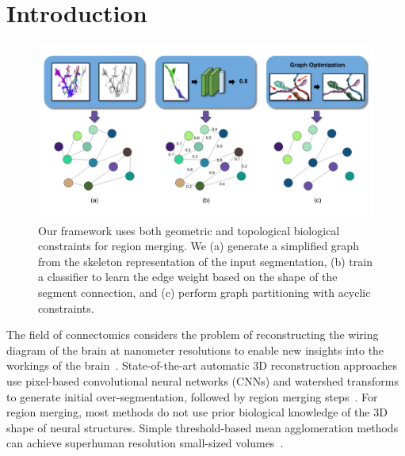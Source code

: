 \section{Introduction}

\begin{figure}[t!]
	\centering
	\includegraphics[width=\linewidth]{./figures/teaser_v4.png}
	\caption{Our framework uses both geometric and topological biological constraints for region merging. We (a) generate a simplified graph from the skeleton representation of the input segmentation, (b) train a classifier to learn the edge weight based on the shape of the segment connection, and (c) perform graph partitioning with acyclic constraints.}
	\label{fig:teaser_pipeline}
\end{figure}

The field of connectomics considers the problem of reconstructing the wiring diagram of the brain at nanometer resolutions to enable new insights into the workings of the brain~\cite{haehn2017scalable,kasthuri2015saturated}. 
State-of-the-art automatic 3D reconstruction approaches use pixel-based convolutional neural networks (CNNs) and watershed transforms to generate initial over-segmentation, followed by region merging steps~\cite{seymour2016rhoananet,lee2015recursive,nunez2014graph,parag2017anisotropic,ronneberger2015u,zlateski2015image}.
For region merging, most methods do not use prior biological knowledge of the 3D shape of neural structures.
Simple threshold-based mean agglomeration methods can achieve superhuman resolution  small-sized volumes~\cite{lee2017superhuman}.

